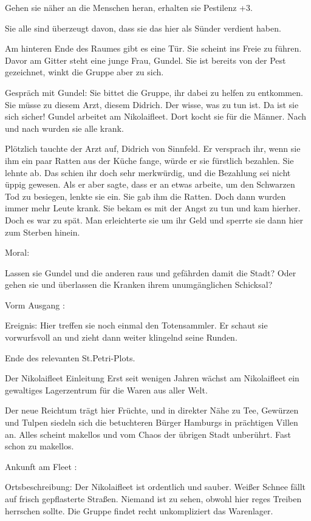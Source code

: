 Gehen sie näher an die Menschen heran, erhalten sie Pestilenz +3.

Sie alle sind überzeugt davon, dass sie das hier als Sünder verdient haben.

Am hinteren Ende des Raumes gibt es eine Tür. Sie scheint ins Freie zu führen. Davor am Gitter steht eine junge Frau, Gundel. Sie ist bereits von der Pest gezeichnet, winkt die Gruppe aber zu sich.

Gespräch mit Gundel: Sie bittet die Gruppe, ihr dabei zu helfen zu entkommen. Sie müsse zu diesem Arzt, diesem Didrich. Der wisse, was zu tun ist. Da ist sie sich sicher! Gundel arbeitet am Nikolaifleet. Dort kocht sie für die Männer. Nach und nach wurden sie alle krank.

Plötzlich tauchte der Arzt auf, Didrich von Sinnfeld. Er versprach ihr, wenn sie ihm ein paar Ratten aus der Küche fange, würde er sie fürstlich bezahlen. Sie lehnte ab. Das schien ihr doch sehr merkwürdig, und die Bezahlung sei nicht üppig gewesen. Als er aber sagte, dass er an etwas arbeite, um den Schwarzen Tod zu besiegen, lenkte sie ein. Sie gab ihm die Ratten. Doch dann wurden immer mehr Leute krank. Sie bekam es mit der Angst zu tun und kam hierher. Doch es war zu spät. Man erleichterte sie um ihr Geld und sperrte sie dann hier zum Sterben hinein.


Moral:

Lassen sie Gundel und die anderen raus und gefährden damit die Stadt? Oder gehen sie und überlassen die Kranken ihrem unumgänglichen Schicksal?

Vorm Ausgang
:

Ereignis: Hier treffen sie noch einmal den Totensammler. Er schaut sie vorwurfsvoll an und zieht dann weiter klingelnd seine Runden.


Ende des relevanten St.Petri-Plots.

Der Nikolaifleet
Einleitung
Erst seit wenigen Jahren wächst am Nikolaifleet ein gewaltiges Lagerzentrum für die Waren aus aller Welt.

Der neue Reichtum trägt hier Früchte, und in direkter Nähe zu Tee, Gewürzen und Tulpen siedeln sich die betuchteren Bürger Hamburgs in prächtigen Villen an. Alles scheint makellos und vom Chaos der übrigen Stadt unberührt. Fast schon zu makellos.

Ankunft am Fleet
:

Ortsbeschreibung: Der Nikolaifleet ist ordentlich und sauber. Weißer Schnee fällt auf frisch gepflasterte Straßen. Niemand ist zu sehen, obwohl hier reges Treiben herrschen sollte. Die Gruppe findet recht unkompliziert das Warenlager.


